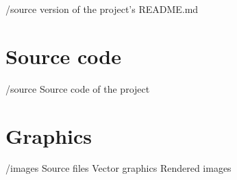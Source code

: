 \begin{FileList}{/source}
   \latex version of the project's README.md
\end{FileList}


\section{Source code}
\begin{FileList}{/source}
   Source code of the project
\end{FileList}


\section{Graphics}
\begin{FileList}{/images}
   Source files
   Vector graphics
   Rendered images
\end{FileList}
